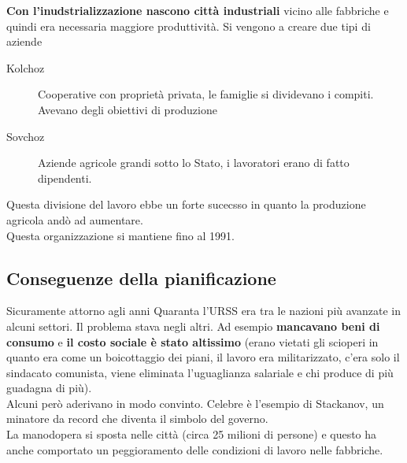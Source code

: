 \textbf{Con l'inudstrializzazione nascono città industriali} vicino alle fabbriche e quindi era
necessaria maggiore produttività. Si vengono a creare due tipi di aziende
\begin{description}
  \item[Kolchoz] Cooperative con proprietà privata, le famiglie si dividevano i compiti. Avevano
    degli obiettivi di produzione
  \item[Sovchoz] Aziende agricole grandi sotto lo Stato, i lavoratori erano di fatto dipendenti.
\end{description}
Questa divisione del lavoro ebbe un forte sucecsso in quanto la produzione agricola andò ad 
aumentare.\\
Questa organizzazione si mantiene fino al 1991.

\subsection{Conseguenze della pianificazione}
Sicuramente attorno agli anni Quaranta l'URSS era tra le nazioni più avanzate in alcuni settori. Il
problema stava negli altri. Ad esempio \textbf{mancavano beni di consumo} e \textbf{il costo sociale
è stato altissimo} (erano vietati gli scioperi in quanto era come un boicottaggio dei piani, il 
lavoro era militarizzato, c'era solo il sindacato comunista, viene eliminata l'uguaglianza salariale
e chi produce di più guadagna di più).\\
Alcuni però aderivano in modo convinto. Celebre è l'esempio di Stackanov, un minatore da record che
diventa il simbolo del governo.\\ [\baselineskip]
La manodopera si sposta nelle città (circa 25 milioni di persone) e questo ha anche comportato un
peggioramento delle condizioni di lavoro nelle fabbriche.

